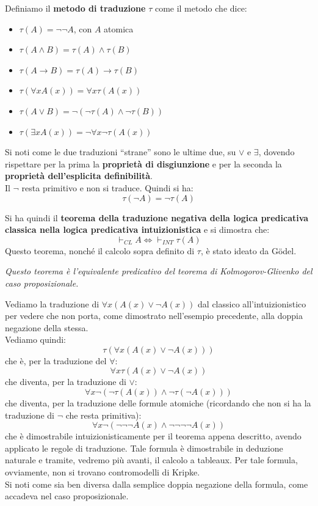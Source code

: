 \documentclass[a4paper,12pt, oneside]{book}
\begin{document}
\begin{definizione}
  Definiamo il \textbf{metodo di traduzione} $\tau$ come il metodo che dice:
  \begin{itemize}
    \item $\tau(A)=\neg\neg A$, con $A$ atomica
    \item $\tau(A\land B)=\tau(A)\land \tau (B)$
    \item $\tau(A\to B)=\tau(A)\to \tau (B)$
    \item $\tau(\forall x A(x))=\forall x\tau(A(x))$
    \item $\tau(A\lor B)=\neg(\neg \tau(A)\land \neg\tau(B))$
    \item $\tau(\exists x A(x))=\neg\forall x\neg\tau(A(x))$
  \end{itemize}
  Si noti come le due traduzioni ``strane'' sono le ultime due, su $\lor$ e
  $\exists$, dovendo rispettare per la prima la \textbf{proprietà di
    disgiunzione} e per la seconda la \textbf{proprietà dell'esplicita
    definibilità}. \\
  Il $\neg$ resta primitivo e non si traduce. Quindi si ha:
  \[\tau(\neg A)=\neg\tau(A)\]
\end{definizione}
\begin{teorema}
  Si ha quindi il \textbf{teorema della traduzione negativa della logica
    predicativa classica nella logica predicativa intuizionistica} e
  si dimostra che:
  \[\vdash_{CL}A\iff \vdash_{INT}\tau(A)\]
  Questo teorema, nonché il calcolo sopra definito di $\tau$, è stato ideato da
  G\"{o}del. 
\end{teorema}
\textit{Questo teorema è l'equivalente predicativo del teorema di
  Kolmogorov-Glivenko del caso proposizionale.}
\begin{esempio}
  Vediamo la traduzione di $\forall x(A(x)\lor\neg A(x))$ dal classico
  all'intuizionistico per vedere che non porta, come dimostrato nell'esempio
  precedente, alla doppia negazione della stessa.\\
  Vediamo quindi:
  \[\tau(\forall x(A(x)\lor\neg A(x)))\]
  che è, per la traduzione del $\forall$:
  \[\forall x\tau(A(x)\lor \neg A(x))\]
  che diventa, per la traduzione di $\lor$:
  \[\forall x\neg(\neg \tau(A(x))\land \neg \tau(\neg A(x)))\]
  che diventa, per la traduzione delle formule atomiche (ricordando che non si
  ha la traduzione di $\neg$ che resta primitiva): 
  \[\forall x\neg(\neg\neg \neg A(x)\land\neg\neg\neg\neg A(x))\]
  che è dimostrabile intuizionisticamente per il teorema appena descritto,
  avendo applicato le regole di traduzione. Tale formula è dimostrabile in
  deduzione naturale e tramite, vedremo più avanti, il calcolo a tableaux. Per
  tale formula, ovviamente, non si trovano contromodelli di Kripke.\\
  Si noti come sia ben diversa dalla semplice doppia negazione della formula,
  come accadeva nel caso proposizionale.
\end{esempio}
\newpage
\end{document}
